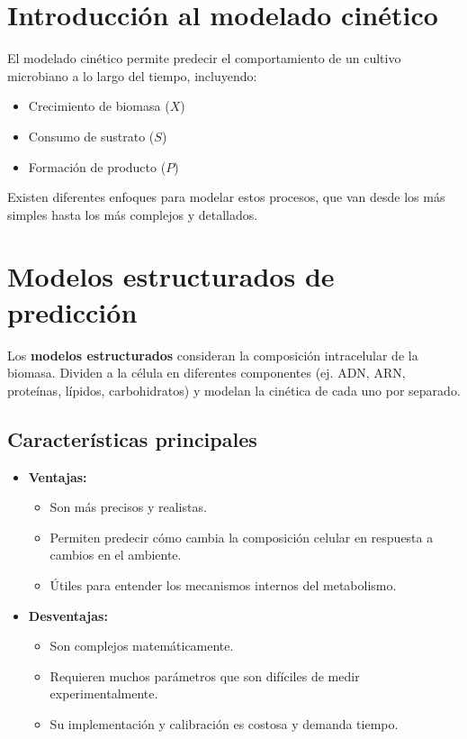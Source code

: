 

\section{Introducción al modelado cinético}

El modelado cinético permite predecir el comportamiento de un cultivo microbiano a lo largo del tiempo, incluyendo:
\begin{itemize}
    \item Crecimiento de biomasa ($X$)
    \item Consumo de sustrato ($S$)
    \item Formación de producto ($P$)
\end{itemize}

Existen diferentes enfoques para modelar estos procesos, que van desde los más simples hasta los más complejos y detallados.

\section{Modelos estructurados de predicción}

Los \textbf{modelos estructurados} consideran la composición intracelular de la biomasa. Dividen a la célula en diferentes componentes (ej. ADN, ARN, proteínas, lípidos, carbohidratos) y modelan la cinética de cada uno por separado.

\subsection{Características principales}
\begin{itemize}
    \item \textbf{Ventajas:}
        \begin{itemize}
            \item Son más precisos y realistas.
            \item Permiten predecir cómo cambia la composición celular en respuesta a cambios en el ambiente.
            \item Útiles para entender los mecanismos internos del metabolismo.
        \end{itemize}
    \item \textbf{Desventajas:}
        \begin{itemize}
            \item Son complejos matemáticamente.
            \item Requieren muchos parámetros que son difíciles de medir experimentalmente.
            \item Su implementación y calibración es costosa y demanda tiempo.
        \end{itemize}
\end{itemize}

